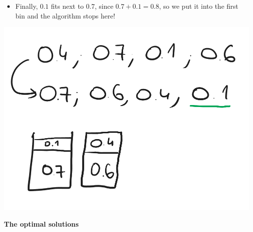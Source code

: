 \begin{itemize}
    \item Finally, $0.1$ fits next to $0.7$, since $0.7+0.1=0.8$, so we put it into the first bin and the algorithm stops here!
\end{itemize}

\begin{center}
    \includegraphics[width=0.5\linewidth]{10/01/ffd_alt_04.png}
\end{center}

\textbf{The optimal solutions}


